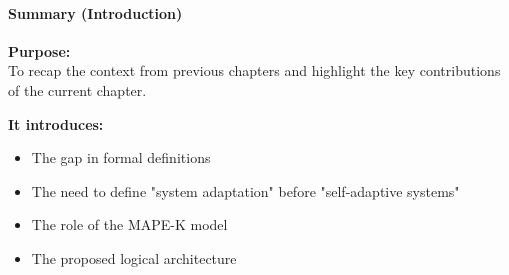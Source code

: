 \paragraph{Summary (Introduction)}
\textbf{Purpose:} \\
To recap the context from previous chapters and highlight the key contributions of the current chapter.

\vspace{0.5em}
\textbf{It introduces:}
\begin{itemize}
    \item The gap in formal definitions
    \item The need to define "system adaptation" before "self-adaptive systems"
    \item The role of the MAPE-K model
    \item The proposed logical architecture
\end{itemize}

